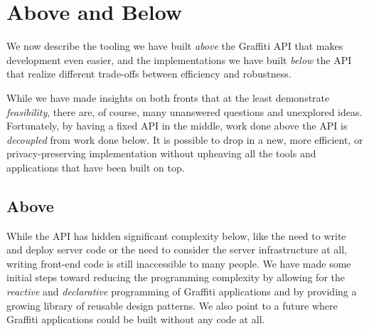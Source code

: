 \section{Above and Below}
\label{above-and-below}

We now describe the tooling we have built \emph{above}
the Graffiti API that makes development even easier, and
the implementations we have built \emph{below} the API
that realize different trade-offs between efficiency and
robustness.

While we have made insights on both fronts that at
the least demonstrate \emph{feasibility},
there are, of course,
many unanswered questions and unexplored ideas.
Fortunately, by having a fixed API in the middle, work done above the API
is \emph{decoupled} from work done below.
It is possible to drop in a new, more efficient, or privacy-preserving implementation
without upheaving all the tools and applications that have been built on top.


\subsection{Above}

While the API has hidden significant complexity below,
like the need to write and deploy server code or the need to
consider the server infrastructure at all,
writing front-end code is still inaccessible
to many people.
We have made some initial steps toward reducing the
programming complexity by allowing for the \emph{reactive} and
\emph{declarative} programming of Graffiti applications
and by providing a growing library of reusable design patterns.
We also point to a future where Graffiti applications could be built
without any code at all.

